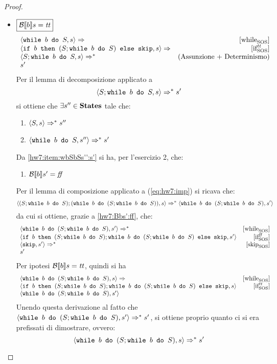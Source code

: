 {\begin{proof}
\begin{itemize}
	\item $\boxed{\B{b} = \semtrue}$
	$$
	\begin{array}{lr}
	\confSs{\wbS{b}{S}}{s} \Rar{ }  & \whileSOS \\
	\confSs{\ifABC{b}{(S;\wbS{b}{S})}{\skipForFriends}}{s} \Rar{ } & \ifttSOS\\
	\confSs{S; \wbS{b}{S}}{s} \Rar{*} & (\text{Assunzione + Determinismo})\\
	s'
	\end{array}
	$$
	Per il lemma di decomposizione applicato a
	\begin{equation}
	\confSs{S; \wbS{b}{S}}{s} \Rar{*} s'
		\label{eq:hw7:imp}
	\end{equation}
	si ottiene che $\exists s'' \in \states$ tale che: 
	\begin{enumerate}[label=(\alph*)]
		\item $\confSs{S}{s} \Rar{*} s''$
		\item $\confSs{\wbS{b}{S}}{s''} \Rar{*} s'$
		\label{hw7:item:wbSbSs'':s'}
	\end{enumerate}
	Da \ref{hw7:item:wbSbSs'':s'} si ha, per l'esercizio 2, che:
	\begin{enumerate}[label=(\Roman*)]
		\item $\B{b}' = \semfalse$
		\label{hw7:Bbs':ff}
	\end{enumerate}  
	Per il lemma di composizione applicato a (\ref{eq:hw7:imp}) si ricava che:
	$$
	\confSs{(S; \wbS{b}{S}); (\wbS{b}{(S; \wbS{b}{S})})}{s} \Rar{*} \confSs{\wbS{b}{(S; \wbS{b}{S})}}{s'} 
	$$
	da cui si ottiene, grazie a \ref{hw7:Bbs':ff}, che:
	$$
	\begin{array}{lr}
	\confSs{\wbS{b}{(S; \wbS{b}{S})}}{s'} \Rar{*} & \whileSOS\\
	\confSs{\ifABC{b}{(S; \wbS{b}{S}); \wbS{b}{(S; \wbS{b}{S})}}{\skipForFriends}}{s'} & \ifffSOS\\
	\confSs{\skipForFriends}{s'} \Rar{*} & \skipSOS\\
	s' & \\
	\label{hw:arary}
	\end{array}
	$$  
	Per ipotesi $\B{b} = \semtrue$, quindi si ha
	$$
	\begin{array}{lr}
	\confSs{\wbS{b}{(S; \wbS{b}{S})}}{s} \Rar{ } & \whileSOS\\
	\confSs{\ifABC{b}{(S; \wbS{b}{S}); \wbS{b}{(S; \wbS{b}{S})}}{\skipForFriends}}{s} & \ifttSOS \\
	\confSs{\wbS{b}{(S; \wbS{b}{S})}}{s'} & 
	\end{array}
	$$
	Unendo questa derivazione al fatto che
	$\confSs{\wbS{b}{(S; \wbS{b}{S})}}{s'} \Rar{*} s'$, si ottiene
	proprio quanto ci si era prefissati di dimostrare, ovvero:
	$$
	\confSs{\wbS{b}{(S; \wbS{b}{S})}}{s} \Rar{*} s'
	$$
\end{itemize}


\end{proof}}
